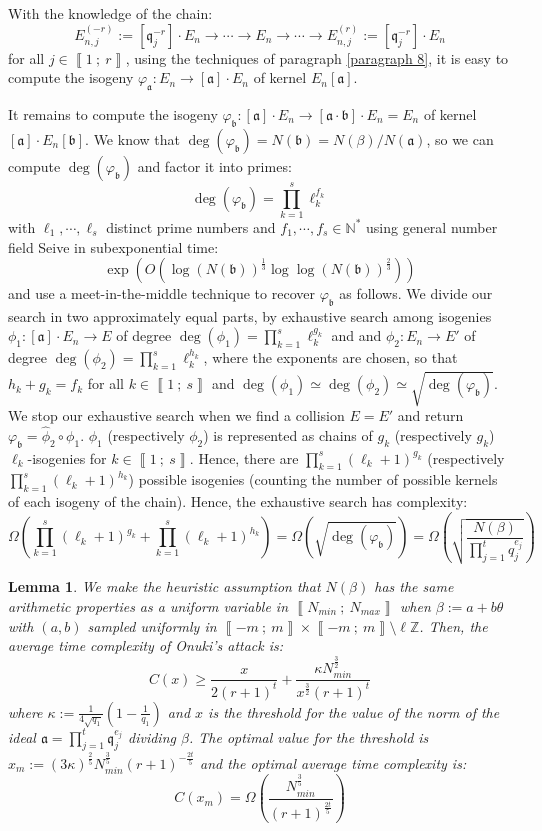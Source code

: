 \documentclass[a4paper,10pt]{report}
\theoremstyle{definition}
\theoremstyle{plain}
\newtheorem{lemma}[definition]{Lemma}
\theoremstyle{definition}
\newcommand{\N}{\mathbb{N}}
\newcommand{\Z}{\mathbb{Z}}
\renewcommand{\i}[2]{\left\llbracket #1~;~#2\right\rrbracket}
\renewcommand{\(}{\left(}
\renewcommand{\)}{\right)}
\newcommand{\mf}[1]{\mathfrak{#1}}
\begin{document}
With the knowledge of the chain: 
\[E_{n,j}^{(-r)}:=[\mf{q}_j^{-r}]\cdot E_n\longrightarrow \cdots \longrightarrow E_{n}\longrightarrow \cdots\longrightarrow E_{n,j}^{(r)}:=[\mf{q}_j^{-r}]\cdot E_n\]
for all $j\in\i{1}{r}$, using the techniques of paragraph \ref{paragraph 8}, it is easy to compute the isogeny $\varphi_{\mf{a}}:E_n\longrightarrow [\mf{a}]\cdot E_n$ of kernel $E_n[\mf{a}]$. 

It remains to compute the isogeny $\varphi_{\mf{b}}:[\mf{a}]\cdot E_n\longrightarrow [\mf{a}\cdot\mf{b}]\cdot E_n=E_n$ of kernel $[\mf{a}]\cdot E_n[\mf{b}]$.  We know that $\deg(\varphi_{\mf{b}})=N(\mf{b})=N(\beta)/N(\mf{a})$, so we can compute $\deg(\varphi_{\mf{b}})$ and factor it into primes:
\[\deg(\varphi_{\mf{b}})=\prod_{k=1}^s\ell_k^{f_k}\]
with $\ell_1,\cdots, \ell_s$ distinct prime numbers and $f_1,\cdots, f_s\in\N^*$ using general number field Seive in subexponential time:
\[\exp\(O\(\log(N(\mf{b}))^{\frac{1}{3}}\log\log(N(\mf{b}))^{\frac{2}{3}}\)\)\] 
and use a meet-in-the-middle technique to recover $\varphi_{\mf{b}}$ as follows. We divide our search in two approximately equal parts, by exhaustive search among isogenies $\phi_1 : [\mf{a}]\cdot E_n\longrightarrow E$ of degree $\deg(\phi_1)=\prod_{k=1}^s\ell_k^{g_k}$ and and $\phi_2 : E_n\longrightarrow E'$ of degree $\deg(\phi_2)=\prod_{k=1}^s\ell_k^{h_k}$, where the exponents are chosen, so that $h_k+g_k=f_k$ for all $k\in\i{1}{s}$ and $\deg(\phi_1)\simeq\deg(\phi_2)\simeq\sqrt{\deg(\varphi_{\mf{b}})}$. We stop our exhaustive search when we find a collision $E=E'$ and return $\varphi_{\mf{b}}=\widehat{\phi}_2\circ\phi_1$. $\phi_1$ (respectively $\phi_2$) is represented as chains of $g_k$ (respectively $g_k$) $\ell_k$-isogenies for $k\in\i{1}{s}$. Hence, there are $\prod_{k=1}^s(\ell_k+1)^{g_k}$ (respectively $\prod_{k=1}^s(\ell_k+1)^{h_k}$) possible isogenies (counting the number of possible kernels of each isogeny of the chain). Hence, the exhaustive search has complexity:
\[\Omega\(\prod_{k=1}^s(\ell_k+1)^{g_k}+\prod_{k=1}^s(\ell_k+1)^{h_k}\)=\Omega(\sqrt{\deg(\varphi_{\mf{b}})})=\Omega\(\sqrt{\frac{N(\beta)}{\prod_{j=1}^t q_j^{e_j}}}\)\]

\begin{lemma}
We make the heuristic assumption that $N(\beta)$ has the same arithmetic properties as a uniform variable in $\i{N_{min}}{N_{max}}$ when $\beta:=a+b\theta$ with $(a,b)$ sampled uniformly in $\i{-m}{m}\times\i{-m}{m}\setminus\ell\Z$. Then, the average time complexity of Onuki's attack \cite[§ 6.3]{Onuki} is:
\[C(x)\geq \frac{x}{2(r+1)^t}+\frac{\kappa N_{min}^{\frac{3}{2}}}{x^{\frac{3}{2}}(r+1)^t}\]
where $\kappa:=\frac{1}{4\sqrt{q_1}}\(1-\frac{1}{q_1}\)$ and $x$ is the threshold for the value of the norm of the ideal $\mf{a}=\prod_{j=1}^t\mf{q}_j^{e_j}$ dividing $\beta$. The optimal value for the threshold is $x_m:=(3\kappa)^{\frac{2}{5}}N_{min}^{\frac{3}{5}}(r+1)^{-\frac{2t}{5}}$ and the optimal average time complexity is: 
\[C(x_m)=\Omega\(\frac{N_{min}^{\frac{3}{5}}}{(r+1)^{\frac{2t}{5}}}\)\]
\end{lemma}
\end{document}
